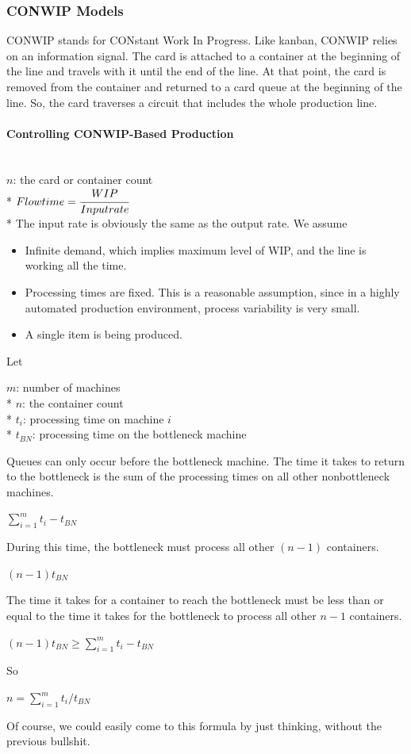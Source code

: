 \documentclass[12pt]{article}
\begin{document}
\subsubsection{CONWIP Models}
CONWIP stands for CONstant Work In Progress. Like kanban, CONWIP relies on an information signal. The card is attached to a container at the beginning of the line and travels with it until the end of the line. At that point, the card is removed from the container and returned to a card queue at the beginning of the line. So, the card traverses a circuit that includes the whole production line.
\paragraph{Controlling CONWIP-Based Production}\mbox{}\\
$n$: the card or container count\\*
$Flowtime = \cfrac{WIP}{Input rate}$\\*
The input rate is obviously the same as the output rate. We assume
\begin{itemize}
\item Infinite demand, which implies maximum level of WIP, and the line is working all the time.
\item Processing times are fixed. This is a reasonable assumption, since in a highly automated production environment, process variability is very small.
\item A single item is being produced.
\end{itemize}
Let
\begin{center}
$m$: number of machines\\*
$n$: the container count\\*
$t_i$: processing time on machine $i$\\*
$t_{BN}$: processing time on the bottleneck machine
\end{center}
Queues can only occur before the bottleneck machine. The time it takes to return to the bottleneck is the sum of the processing times on all other nonbottleneck machines.
\begin{center}
$\sum_{i = 1}^{m}t_i - t_{BN}$
\end{center}
During this time, the bottleneck must process all other $(n-1)$ containers.
\begin{center}
$(n-1)t_{BN}$
\end{center}
The time it takes for a container to reach the bottleneck must be less than or equal to the time it takes for the bottleneck to process all other $n-1$ containers.
\begin{center}
$(n-1)t_{BN} \ge \sum_{i=1}^{m}t_i - t_{BN}$
\end{center}
So
\begin{center}
$n = \sum_{i=1}^{m}t_i/t_{BN}$
\end{center}
Of course, we could easily come to this formula by just thinking, without the previous bullshit.
\end{document}
